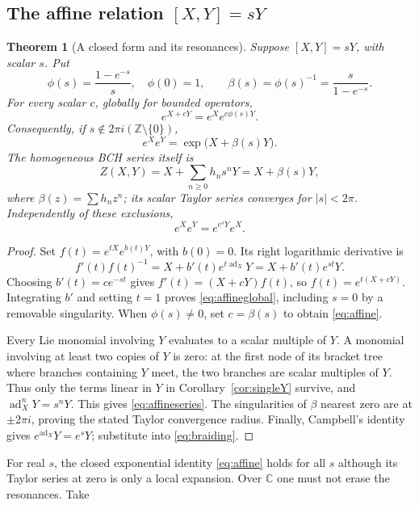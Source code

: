\documentclass[11pt]{article}
\newtheorem{theorem}{Theorem}[section]
\theoremstyle{definition}
\theoremstyle{remark}
\newcommand{\C}{\mathbb C}
\newcommand{\ad}{\operatorname{ad}}
\numberwithin{equation}{section}
\begin{document}
\subsection{The affine relation \texorpdfstring{$[X,Y]=sY$}{[X,Y]=sY}}
\begin{theorem}[A closed form and its resonances]\label{thm:affine}
Suppose $[X,Y]=sY$, with scalar $s$. Put
\[
 \phi(s)=\frac{1-e^{-s}}s,\quad \phi(0)=1,
 \qquad \beta(s)=\phi(s)^{-1}=\frac{s}{1-e^{-s}}.
\]
For every scalar $c$, globally for bounded operators,
\begin{equation}\label{eq:affineglobal}
 e^{X+cY}=e^Xe^{c\phi(s)Y}.
\end{equation}
Consequently, if $s\notin2\pi i(\mathbb Z\setminus\{0\})$,
\begin{equation}\label{eq:affine}
 e^Xe^Y=\exp\bigl(X+\beta(s)Y\bigr).
\end{equation}
The homogeneous BCH series itself is
\begin{equation}\label{eq:affineseries}
 Z(X,Y)=X+\sum_{n\geq0}h_ns^nY=X+\beta(s)Y,
\end{equation}
where $\beta(z)=\sum h_nz^n$; its scalar Taylor series converges for $|s|<2\pi$. Independently of these exclusions,
\begin{equation}\label{eq:affinebraid}
 e^Xe^Y=e^{e^sY}e^X.
\end{equation}
\end{theorem}
\begin{proof}
Set $f(t)=e^{tX}e^{b(t)Y}$, with $b(0)=0$. Its right logarithmic derivative is
\[
 f'(t)f(t)^{-1}=X+b'(t)e^{t\ad_X}Y=X+b'(t)e^{st}Y.
\]
Choosing $b'(t)=ce^{-st}$ gives $f'(t)=(X+cY)f(t)$, so
$f(t)=e^{t(X+cY)}$. Integrating $b'$ and setting $t=1$ proves \eqref{eq:affineglobal}, including $s=0$ by a removable singularity. When $\phi(s)\ne0$, set $c=\beta(s)$ to obtain \eqref{eq:affine}.

Every Lie monomial involving $Y$ evaluates to a scalar multiple of $Y$. A monomial involving at least two copies of $Y$ is zero: at the first node of its bracket tree where branches containing $Y$ meet, the two branches are scalar multiples of $Y$. Thus only the terms linear in $Y$ in Corollary~\ref{cor:singleY} survive, and $\ad_X^nY=s^nY$. This gives \eqref{eq:affineseries}. The singularities of $\beta$ nearest zero are at $\pm2\pi i$, proving the stated Taylor convergence radius. Finally, Campbell's identity gives $e^{\ad_X}Y=e^sY$; substitute into \eqref{eq:braiding}.
\end{proof}
For real $s$, the closed exponential identity \eqref{eq:affine} holds for all $s$ although its Taylor series at zero is only a local expansion. Over $\C$ one must not erase the resonances. Take
\end{document}
